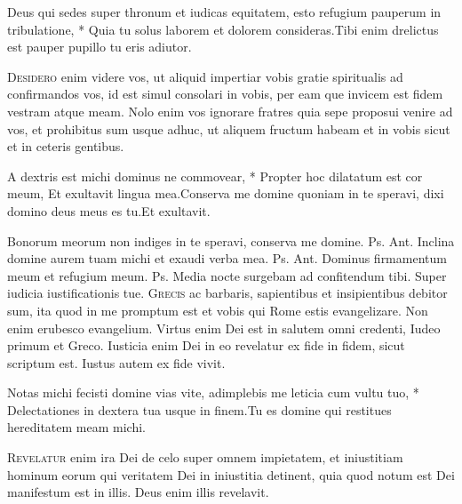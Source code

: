 \begin{multicols*}{2}
\begin{responsory}
{Deus qui sedes super thronum et iudicas equitatem, esto refugium pauperum in tribulatione, * Quia tu solus laborem et dolorem consideras.}{Tibi enim drelictus est pauper pupillo tu eris adiutor.}
\end{responsory}
\lettrine[lines=2]{\zallmancaps \color{Red} D}{esidero} enim videre vos, ut aliquid impertiar vobis gratie spiritualis ad confirmandos vos, id est simul consolari in vobis, per eam que invicem est fidem vestram atque meam. Nolo enim vos ignorare fratres quia sepe proposui venire ad vos, et prohibitus sum usque adhuc, ut aliquem fructum habeam et in vobis sicut et in ceteris gentibus.
\begin{responsory-final}
{A dextris est michi dominus ne commovear, * Propter hoc dilatatum est cor meum,  Et exultavit lingua mea.}{Conserva me domine quoniam in te speravi, dixi domino deus meus es tu.}{Et exultavit.}
\end{responsory-final}
 Bonorum meorum non indiges in te speravi, conserva me domine. {\color{Red} Ps.}  {\color{Red} Ant.} Inclina domine aurem tuam michi et exaudi verba mea. {\color{Red} Ps.}  {\color{Red} Ant.} Dominus firmamentum meum et refugium meum. {\color{Red} Ps.}  \V Media nocte surgebam ad confitendum tibi. \R Super iudicia iustificationis tue.
\lettrine[lines=2]{\zallmancaps \color{Blue} G}{recis} ac barbaris, sapientibus et insipientibus debitor sum, ita quod in me promptum est et vobis qui Rome estis evangelizare. Non enim erubesco evangelium. Virtus enim Dei est in salutem omni credenti, Iudeo primum et Greco. Iusticia enim Dei in eo revelatur ex fide in fidem, sicut scriptum est. Iustus autem ex fide vivit.
\begin{responsory}
{Notas michi fecisti domine vias vite, adimplebis me leticia cum vultu tuo, * Delectationes in dextera tua usque in finem.}{Tu es domine qui restitues hereditatem meam michi.}
\end{responsory}
\lettrine[lines=2]{\zallmancaps \color{Red} R}{evelatur} enim ira Dei de celo super omnem impietatem, et iniustitiam hominum eorum qui veritatem Dei in iniustitia detinent, quia quod notum est Dei manifestum est in illis. Deus enim illis revelavit.

\end{multicols*}
